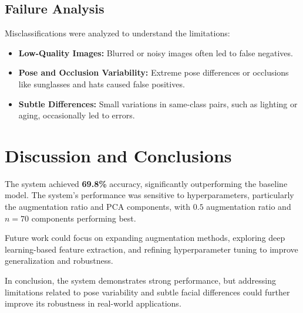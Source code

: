 \documentclass[a4paper]{article}
\begin{document}
\subsection{Failure Analysis}
Misclassifications were analyzed to understand the limitations:
\begin{itemize}
    \item \textbf{Low-Quality Images:} Blurred or noisy images often led to false negatives.
    \item \textbf{Pose and Occlusion Variability:} Extreme pose differences or occlusions like sunglasses and hats caused false positives.
    \item \textbf{Subtle Differences:} Small variations in same-class pairs, such as lighting or aging, occasionally led to errors.
\end{itemize}

\section{Discussion and Conclusions}

The system achieved \textbf{69.8\%} accuracy, significantly outperforming the baseline model. The system's performance was sensitive to hyperparameters, particularly the augmentation ratio and PCA components, with \(0.5\) augmentation ratio and \(n=70\) components performing best.

Future work could focus on expanding augmentation methods, exploring deep learning-based feature extraction, and refining hyperparameter tuning to improve generalization and robustness.

In conclusion, the system demonstrates strong performance, but addressing limitations related to pose variability and subtle facial differences could further improve its robustness in real-world applications.



\end{document}
